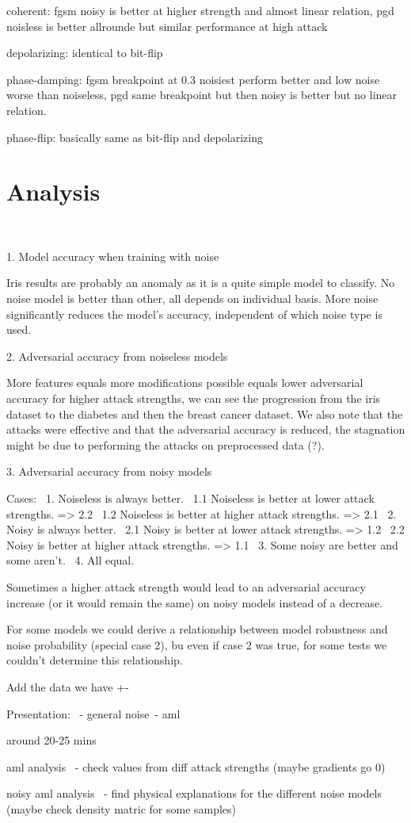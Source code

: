 coherent: fgsm noisy is better at higher strength and almost linear relation, pgd noisless is better allrounde but similar performance at high attack \

depolarizing: identical to bit-flip

phase-damping: fgsm breakpoint at 0.3 noisiest perform better and low noise worse than noiseless, pgd same breakpoint but then noisy is better but no linear relation. \

phase-flip: basically same as bit-flip and depolarizing \


\section{Analysis}\label{section:analysis} \

1. Model accuracy when training with noise \

Iris results are probably an anomaly as it is a quite simple model to classify.
No noise model is better than other, all depends on individual basis.
More noise significantly reduces the model's accuracy, independent
of which noise type is used. \

2. Adversarial accuracy from noiseless models \

More features equals more modifications possible equals
lower adversarial accuracy for higher attack strengths,
we can see the progression from the iris dataset to the
diabetes and then the breast cancer dataset. We also
note that the attacks were effective and that
the adversarial accuracy is reduced, the stagnation
might be due to performing the attacks on preprocessed
data (?). \

3. Adversarial accuracy from noisy models \

Cases: \
1. Noiseless is always better. \
  1.1 Noiseless is better at lower attack strengths.  => 2.2 \
  1.2 Noiseless is better at higher attack strengths. => 2.1 \
2. Noisy is always better. \
  2.1 Noisy is better at lower attack strengths.  => 1.2 \
  2.2 Noisy is better at higher attack strengths. => 1.1 \
3. Some noisy are better and some aren't. \
4. All equal. \

Sometimes a higher attack strength would lead to an adversarial
accuracy increase (or it would remain the same) on noisy
models instead of a decrease. \ 

For some models we could derive a relationship between
model robustness and noise probability (special case 2), bu
even if case 2 was true, for some tests we couldn't determine
this relationship. \


Add the data we have +- \

Presentation: \
 - general noise\
 - aml \

 around 20-25 mins \


 aml analysis \
 - check values from diff attack strengths (maybe gradients go 0) \


 noisy aml analysis \
 - find physical explanations for the different noise models (maybe check density matric for some samples) \